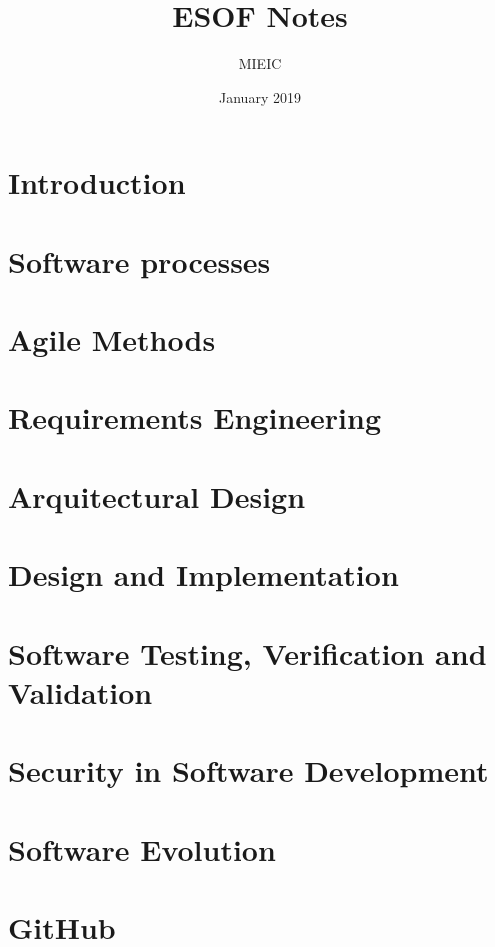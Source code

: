 \documentclass{article}
\title{ESOF Notes}
\author{MIEIC}
\date{January 2019}
\begin{document}
\maketitle

\tableofcontents

\section{Introduction}



\section{Software processes}



\section{Agile Methods}



\section{Requirements Engineering}



\section{Arquitectural Design}



\section{Design and Implementation}



\section{Software Testing, Verification and Validation}



\section{Security in Software Development}



\section{Software Evolution}



\section{GitHub}


\end{document}
